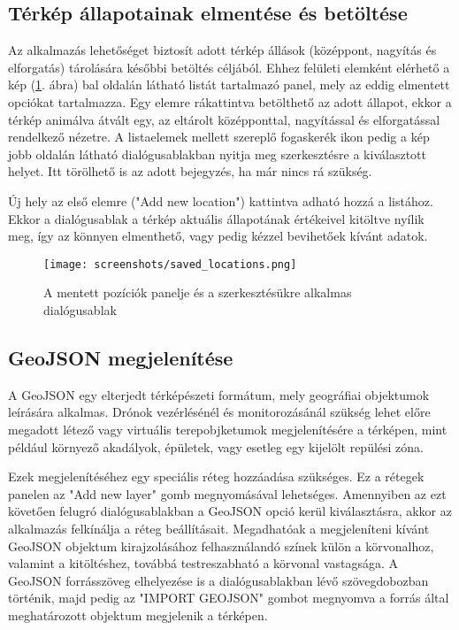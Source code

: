 \subsection{Térkép állapotainak elmentése és betöltése}

Az alkalmazás lehetőséget biztosít adott térkép állások (középpont, nagyítás és
elforgatás) tárolására későbbi betöltés céljából. Ehhez felületi elemként
elérhető a kép (\ref{fig:saved_locations}. ábra) bal oldalán látható listát
tartalmazó panel, mely az eddig elmentett opciókat tartalmazza. Egy elemre
rákattintva betölthető az adott állapot, ekkor a térkép animálva átvált egy,
az eltárolt középponttal, nagyítással és elforgatással rendelkező nézetre. A
listaelemek mellett szereplő fogaskerék ikon pedig a kép jobb oldalán látható
dialógusablakban nyitja meg szerkesztésre a kiválasztott helyet. Itt törölhető
is az adott bejegyzés, ha már nincs rá szükség.

Új hely az első elemre ("Add new location") kattintva adható hozzá a
listához. Ekkor a dialógusablak a térkép aktuális állapotának értékeivel
kitöltve nyílik meg, így az könnyen elmenthető, vagy pedig kézzel bevihetőek
kívánt adatok.

\begin{figure}[H]
  \center
  \texttt{[image: screenshots/saved\_locations.png]}
  \caption{A mentett pozíciók panelje és a szerkesztésükre alkalmas dialógusablak}
  \label{fig:saved_locations}
\end{figure}


\subsection{GeoJSON megjelenítése}

A GeoJSON egy elterjedt térképészeti formátum, mely geográfiai objektumok
leírására alkalmas. Drónok vezérlésénél és monitorozásánál szükség lehet előre
megadott létező vagy virtuális terepobjketumok megjelenítésére a térképen, mint
például környező akadályok, épületek, vagy esetleg egy kijelölt repülési zóna.

Ezek megjelenítéséhez egy speciális réteg hozzáadása szükséges. Ez a rétegek
panelen az "Add new layer" gomb megnyomásával lehetséges. Amennyiben az ezt
követően felugró dialógusablakban a GeoJSON opció kerül kiválasztásra, akkor az
alkalmazás felkínálja a réteg beállításait. Megadhatóak a megjeleníteni kívánt
GeoJSON objektum kirajzolásához felhasználandó színek külön a körvonalhoz,
valamint a kitöltéshez, továbbá testreszabható a körvonal vastagsága. A GeoJSON
forrásszöveg elhelyezése is a dialógusablakban lévő szövegdobozban történik,
majd pedig az "IMPORT GEOJSON" gombot megnyomva a forrás által meghatározott
objektum megjelenik a térképen.

